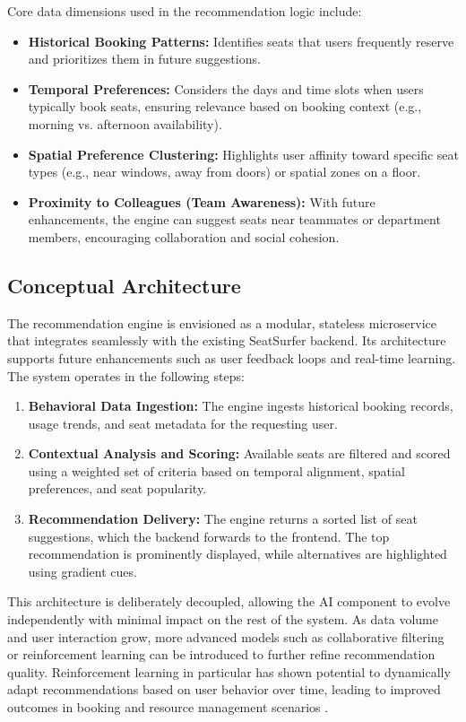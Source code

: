 \documentclass[12pt,a4paper]{report} %
\begin{document}
Core data dimensions used in the recommendation logic include:

\begin{itemize}
\item \textbf{Historical Booking Patterns:}
Identifies seats that users frequently reserve and prioritizes them in future suggestions.
\item \textbf{Temporal Preferences:}
Considers the days and time slots when users typically book seats, ensuring relevance based on booking context (e.g., morning vs. afternoon availability).
\item \textbf{Spatial Preference Clustering:}
Highlights user affinity toward specific seat types (e.g., near windows, away from doors) or spatial zones on a floor.
\item \textbf{Proximity to Colleagues (Team Awareness):}
With future enhancements, the engine can suggest seats near teammates or department members, encouraging collaboration and social cohesion.
\end{itemize}

\subsection*{Conceptual Architecture}

The recommendation engine is envisioned as a modular, stateless microservice that integrates seamlessly with the existing SeatSurfer backend. Its architecture supports future enhancements such as user feedback loops and real-time learning. The system operates in the following steps:

\begin{enumerate}
\item \textbf{Behavioral Data Ingestion:}
The engine ingests historical booking records, usage trends, and seat metadata for the requesting user.
\item \textbf{Contextual Analysis and Scoring:}
Available seats are filtered and scored using a weighted set of criteria based on temporal alignment, spatial preferences, and seat popularity.
\item \textbf{Recommendation Delivery:}
The engine returns a sorted list of seat suggestions, which the backend forwards to the frontend. The top recommendation is prominently displayed, while alternatives are highlighted using gradient cues.
\end{enumerate}

This architecture is deliberately decoupled, allowing the AI component to evolve independently with minimal impact on the rest of the system. As data volume and user interaction grow, more advanced models such as collaborative filtering or reinforcement learning can be introduced to further refine recommendation quality. Reinforcement learning in particular has shown potential to dynamically adapt recommendations based on user behavior over time, leading to improved outcomes in booking and resource management scenarios \cite{cai2022rl}.
\end{document}
